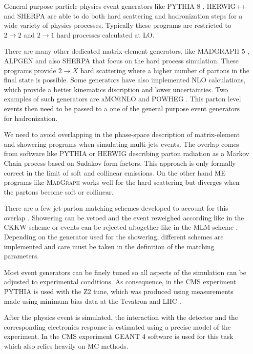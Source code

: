 General purpose particle physics event generators like \textsc{PYTHIA 8} \cite{ARTICLE:Pythia6p4PhysicsAndManual,ARTICLE:Pythia8p1Introduction}, \textsc{HERWIG++} \cite{ARTICLE:HERWIGPhysicsAndManual} and \textsc{SHERPA} \cite{ARTiCLE:SherpaEventGenerator} are able to do both hard scattering and hadronization steps for a wide variety of physics processes. Typically these programs are restricted to $2 \rightarrow 2$ and $2 \rightarrow 1$ hard processes calculated at \gls{LO}.

There are many other dedicated matrix-element generators, like \textsc{MADGRAPH 5} \cite{ARTICLE:MadGraph5}, \textsc{ALPGEN} \cite{ARTICLE:ALPGENGenerator} and also \textsc{SHERPA} that focus on the hard process simulation. These programs provide $2 \rightarrow X$ hard scattering where a higher number of partons in the final state is possible. Some generators have also implemented \gls{NLO} calculations, which provide a better kinematics discription and lower uncertainties. Two examples of such generators are \textsc{aMC@NLO} \cite{ARTICLE:aMCatNLO} and \textsc{POWHEG} \cite{ARTICLE:POWHEG_2007,ARTICLE:POWHEG_2011}. This parton level events then need to be passed to a one of the general purpose event generators for hadronization. 

We need to avoid overlapping in the phase-space description of matrix-element and showering programs when simulating multi-jets events. The overlap comes from software like \textsc{PYTHIA} or \textsc{HERWIG} describing parton radiation as a Markov Chain process based on Sudakov form factors. This approach is only formally correct in the limit of soft and collinear emissions. On the other hand \gls{ME} programs like \textsc{MadGraph} works well for the hard scattering but diverges when the partons become soft or collinear. 

There are a few jet-parton matching schemes developed to account for this overlap \cite{ARTICLE:MatchingPartonShowersAndMatrixElements}. Showering can be vetoed and the event reweighed according like in the CKKW scheme \cite{ARTICLE:CKKWSchemeRef1,ARTICLE:CKKWSchemeRef2,ARTICLE:CKKWSchemeRef3} or events can be rejected altogether like in the MLM scheme \cite{ARTICLE:MLMScheme}. Depending on the generator used for the showering, different schemes are implemented and care must be taken in the definition of the matching parameters.

Most event generators can be finely tuned so all aspects of the simulation can be adjusted to experimental conditions. As consequence, in the \gls{CMS} experiment \textsc{PYTHIA} is used with the Z2 tune, which was produced using measurements made using minimum bias data at the Tevatron and \gls{LHC} \cite{ARTICLE:CMSMeasurementUnderlyingEventActivity}.  

After the physics event is simulated, the interaction with the detector and the corresponding electronics response is estimated using a precise model of the experiment. In the \gls{CMS} experiment \textsc{GEANT 4} \cite{ARTICLE:GEANT4ASimulationToolkit,ARTICLE:Geant4DevelopmentsAndApplications} software is used for this task which also relies heavily on \gls{MC} methods.




